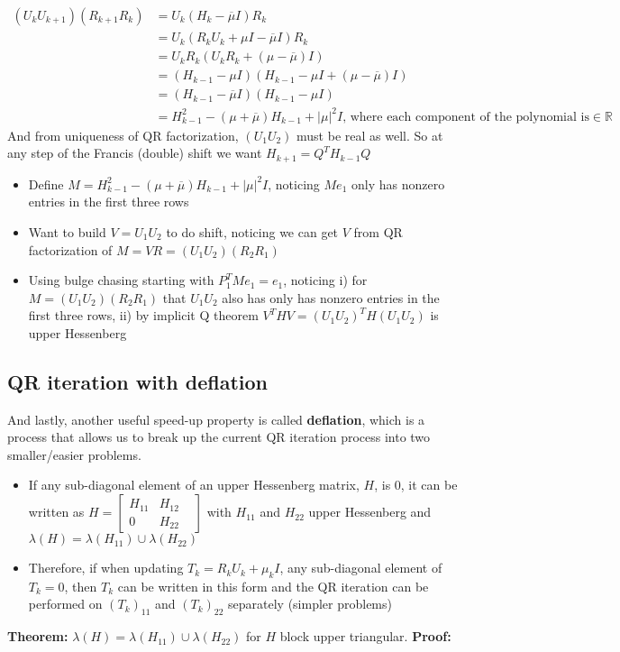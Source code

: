 \documentclass{article}
\newcommand{\abs}[1]{\lvert#1\rvert}
\begin{document}
\begin{align*}
    (U_kU_{k+1})(R_{k+1}R_k) &= U_k(H_k - \overline{\mu}I)R_k\\
    &= U_k(R_kU_k + \mu I - \overline{\mu}I)R_k\\
    &= U_kR_k(U_kR_k + (\mu - \overline{\mu})I)\\
    &= (H_{k-1} - \mu I)(H_{k-1} - \mu I + (\mu - \overline{\mu})I)\\
    &= (H_{k-1} - \overline{\mu}I)(H_{k-1} - \mu I)\\
    &= H_{k-1}^2 - (\mu + \overline{\mu})H_{k-1} + \abs{\mu}^2I \textrm{, where each component of the polynomial is} \in \mathbb{R}
\end{align*}
And from uniqueness of QR factorization, $(U_1U_2)$ must be real as well. So at any step of the Francis (double) shift we want $H_{k+1} = Q^TH_{k-1}Q$
\begin{itemize}
    \item Define $M = H_{k-1}^2 - (\mu + \overline{\mu})H_{k-1} + \abs{\mu}^2I$, noticing $Me_1$ only has nonzero entries in the first three rows
    \item Want to build $V = U_1U_2$ to do shift, noticing we can get $V$ from QR factorization of $M = VR = (U_1U_2)(R_2R_1)$
    \item Using bulge chasing starting with $P_1^TMe_1 = e_1$, noticing i) for $M = (U_1U_2)(R_2R_1)$ that $U_1U_2$ also has only has nonzero entries in the first three rows, ii) by implicit Q theorem $V^THV = (U_1U_2)^TH(U_1U_2)$ is upper Hessenberg
\end{itemize}

\subsection{QR iteration with deflation}
And lastly, another useful speed-up property is called \textbf{deflation}, which is a process that allows us to break up the current QR iteration process into two smaller/easier problems.
\begin{itemize}
    \item If any sub-diagonal element of an upper Hessenberg matrix, $H$, is 0, it can be written as $H = \begin{bmatrix} H_{11} & H_{12} \\ 0 & H_{22} &\end{bmatrix}$ with $H_{11}$ and $H_{22}$ upper Hessenberg and $\lambda(H) = \lambda(H_{11})\cup \lambda(H_{22})$
    \item Therefore, if when updating $T_k = R_kU_k + \mu_k I$, any sub-diagonal element of $T_k = 0$, then $T_k$ can be written in this form and the QR iteration can be performed on $(T_k)_{11}$ and $(T_k)_{22}$ separately (simpler  problems)
\end{itemize}
\textbf{Theorem:} $\lambda(H) = \lambda(H_{11})\cup \lambda(H_{22})$ for $H$ block upper triangular. \textbf{Proof:}
\end{document}
